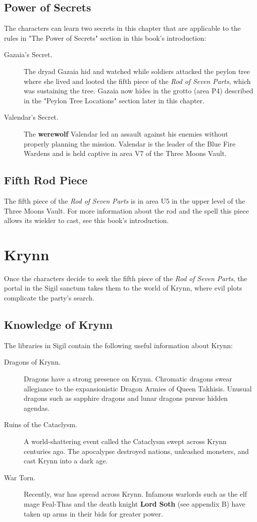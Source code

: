 \documentclass[10pt,a4paper,twoside,bg=print,twocolumn,openany,nodeprecatedcode]{dndbook}
\begin{document}
\subsection{Power of Secrets}
The characters can learn two secrets in this chapter that are applicable to the rules in "The Power of Secrets" section in this book's introduction:


\begin{description}
\item[Gazaia's Secret.]
The dryad Gazaia hid and watched while soldiers attacked the peylon tree where she lived and looted the fifth piece of the \textit{Rod of Seven Parts}, which was sustaining the tree. Gazaia now hides in the grotto (area P4) described in the "Peylon Tree Locations" section later in this chapter.
\item[Valendar's Secret.]
The \textbf{werewolf} Valendar led an assault against his enemies without properly planning the mission. Valendar is the leader of the Blue Fire Wardens and is held captive in area V7 of the Three Moons Vault.
\end{description}

\subsection{Fifth Rod Piece}
The fifth piece of the \textit{Rod of Seven Parts} is in area U5 in the upper level of the Three Moons Vault. For more information about the rod and the spell this piece allows its wielder to cast, see this book's introduction.

\section{Krynn}
Once the characters decide to seek the fifth piece of the \textit{Rod of Seven Parts}, the portal in the Sigil sanctum takes them to the world of Krynn, where evil plots complicate the party's search.

\subsection{Knowledge of Krynn}
The libraries in Sigil contain the following useful information about Krynn:


\begin{description}
\item[Dragons of Krynn.]
Dragons have a strong presence on Krynn. Chromatic dragons swear allegiance to the expansionistic Dragon Armies of Queen Takhisis. Unusual dragons such as sapphire dragons and lunar dragons pursue hidden agendas.
\item[Ruins of the Cataclysm.]
A world-shattering event called the Cataclysm swept across Krynn centuries ago. The apocalypse destroyed nations, unleashed monsters, and cast Krynn into a dark age.
\item[War Torn.]
Recently, war has spread across Krynn. Infamous warlords such as the elf mage Feal-Thas and the death knight \textbf{Lord Soth} (see appendix B) have taken up arms in their bids for greater power.
\end{description}
\end{document}
